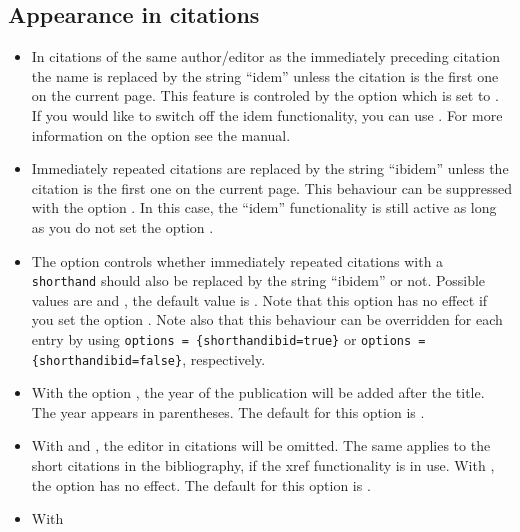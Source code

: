 \documentclass[english]{scrartcl}
\begin{document}
\subsection{Appearance in citations}
\begin{itemize}
	\item In citations of the same author\slash editor as the
	      immediately preceding citation the name is replaced by 
	      the string \enquote{idem} unless the citation is the first 
	      one on the current page. This feature is controled by the
	      \bl{} option  which is set to . If
	      you would like to switch off the idem functionality, you can use 
	      . For more information on the
	       option see the \bl{} manual.
	\item Immediately repeated citations are replaced by the string
	      \enquote{ibidem} unless the citation is the first one on
	      the current page. This behaviour can be suppressed with
	      the \bl{} option . In this case,
	      the \enquote{idem} functionality
	      is still active as long as you do not set the option
	      .
	\item The option  controls whether
	      immediately repeated citations with a \texttt{shorthand} 
	      should also be replaced by the string \enquote{ibidem} or 
	      not. Possible values are  and , 
	      the default value is . Note that this option has
	      no effect if you set the option .
	      Note also that this behaviour can be overridden
	      for each entry by using \texttt{options\,=\,\{shorthandibid=true\}} or 
	      \texttt{options\,=\,\{shorthandibid=false\}}, respectively.
  \item With the option , the year of the 
			  publication will be added after the title. The year appears in 
		    parentheses. The default for this option is .
	\item With  and , the editor 
	      in citations will be omitted. The same applies to the short citations in
				the bibliography, if the xref functionality is in use. With 
				, the option  has
				no effect. The default for this option is .
	\item With

\end{itemize}
\end{document}
